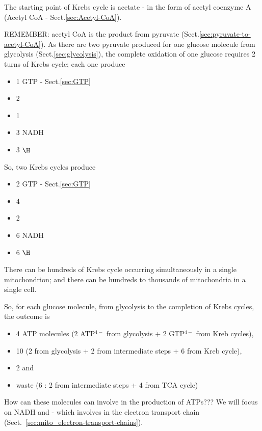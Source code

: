 The starting point of Krebs cycle is acetate - in the form of acetyl coenzyme A
(Acetyl CoA - Sect.\ref{sec:Acetyl-CoA}).

REMEMBER: acetyl CoA is the product from pyruvate (Sect.\ref{sec:pyruvate-to-acetyl-CoA}).
As there are two pyruvate produced for one glucose molecule from glycolysis
(Sect.\ref{sec:glycolysis}), the complete oxidation of one glucose requires 2
turns of Krebs cycle; each one produce
\begin{itemize}
  \item 1 GTP - Sect.\ref{sec:GTP}
  \item 2 
  \item 1 
  \item 3 NADH
  \item 3 $\H$
\end{itemize}
So, two Krebs cycles produce
\begin{itemize}
  \item 2 GTP - Sect.\ref{sec:GTP}
  \item 4 
  \item 2 
  \item 6 NADH
  \item 6 $\H$
\end{itemize}

\begin{mdframed}
There can be hundreds of Krebs cycle occurring simultaneously in a single
mitochondrion; and there can be hundreds to thousands of mitochondria in a
single cell.

So, for each glucose molecule, from glycolysis to the completion of
Krebs cycles, the outcome is
\begin{itemize}
  \item  4 ATP molecules (2 ATP$^{4-}$ from glycolysis +  2 GTP$^{4-}$ from Kreb
  cycles),

  \item 10  (2 from glycolysis + 2 from intermediate steps + 6 from
  Kreb cycle),

  \item 2  and

  \item waste (6 : 2 from intermediate steps + 4 from TCA cycle)
\end{itemize}

How can these molecules can involve in the production of ATPs??? We will
focus on NADH and  - which involves in the electron transport chain
(Sect.~\ref{sec:mito_electron-transport-chains}).

\end{mdframed}

